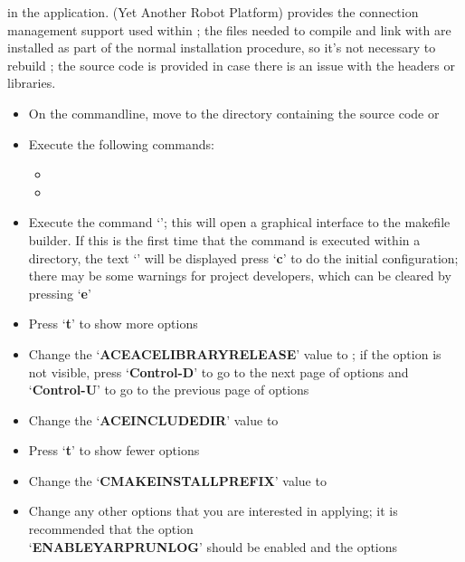 in the  application.
\tertiaryEnd
\secondaryEnd
{}
\textbf{\yarp} (Yet Another Robot Platform) provides the connection management support
used within \mplusm{}; the files needed to compile and link with \yarp{} are installed as
part of the normal \mplusm{} installation procedure, so it's not necessary to rebuild
\yarp{}; the source code is provided in case there is an issue with the headers or
libraries.
\begin{itemize}
\item On the command\longDash{}line, move to the directory containing the \yarp{} source
code \longDash{}  or\\
\item\exSp{}Execute the following commands:
\begin{itemize}
\item {}
\item\exSp{}
\end{itemize}
\item\exSp{}Execute the command `'; this will open a graphical
interface to the makefile builder. If this is the first time that the command is executed
within a directory, the text `' will be displayed \longDash{} press
`\textbf{c}' to do the initial configuration; there may be some warnings for project
developers, which can be cleared by pressing `\textbf{e}'
\item\exSp{}Press `\textbf{t}' to show more options
\item\exSp{}Change the `\textbf{ACE\fUS{}ACE\fUS{}LIBRARY\fUS{}RELEASE}' value to
; if the option is not visible, press
`\textbf{Control-D}' to go to the next page of options and `\textbf{Control-U}' to go to
the previous page of options
\item\exSp{}Change the `\textbf{ACE\fUS{}INCLUDE\fUS{}DIR}' value to
\item\exSp{}Press `\textbf{t}' to show fewer options
\item\exSp{}Change the `\textbf{CMAKE\fUS{}INSTALL\fUS{}PREFIX}' value to
\item\exSp{}Change any other options that you are interested in applying; it is
recommended that the option\\
`\textbf{ENABLE\fUS{}YARPRUN\fUS{}LOG}' should be enabled and the options

\end{itemize}

